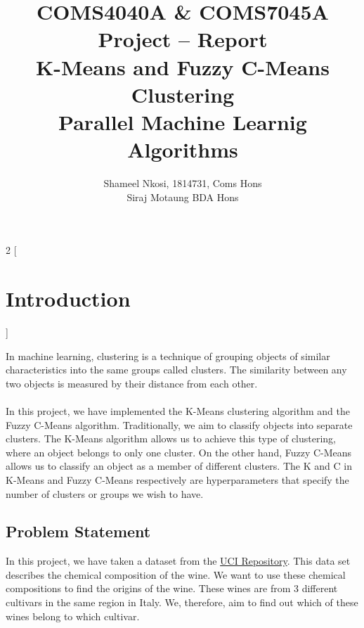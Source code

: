


\title{COMS4040A \& COMS7045A Project  -- Report
    \\  K-Means and Fuzzy C-Means Clustering
    \\ Parallel Machine Learnig Algorithms
    }
\author{Shameel Nkosi, 1814731,  Coms Hons \\
        Siraj Motaung BDA Hons}
\maketitle 
\pagestyle{fancy}
\fancyhf{}
\fancyhead[R]{\thepage}

\newpage
{} 

\begin{multicols*}{2}
    [
        \section{Introduction}
    ]
    

    In machine learning, clustering is a technique of grouping objects of similar characteristics into the same groups called clusters. The similarity between any two objects is measured by their distance from each other. \\ \\
    In this project, we have implemented the K-Means clustering algorithm and the Fuzzy C-Means algorithm. Traditionally, we aim to classify objects into separate clusters. The K-Means algorithm allows us to achieve this type of clustering, where an object belongs to only one cluster. On the other hand, Fuzzy C-Means allows us to classify an object as a member of different clusters.
    The K and C in K-Means and Fuzzy C-Means respectively are hyperparameters that specify the number of clusters or groups we wish to have.  

    \subsection{Problem Statement}
    In this project, we have taken a dataset from the \href{https://archive.ics.uci.edu/ml/datasets/wine}{ UCI Repository}. This data set describes the chemical composition of the wine. We want to use these chemical compositions to find the origins of the wine. These wines are from 3 different cultivars in the same region in Italy. We, therefore, aim to find out which of these wines belong to which cultivar.


\end{multicols*}
